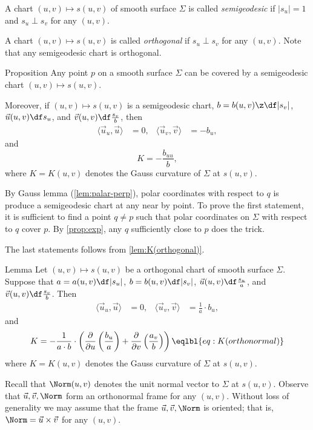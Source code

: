 A chart $(u,v)\mapsto s(u,v)$ of smooth surface $\Sigma$ is called \emph{semigeodesic} if $|s_u|=1$ and $s_u\perp s_v$ for any $(u,v)$.

A chart $(u,v)\mapsto s(u,v)$ is called \emph{orthogonal} if $s_u\perp s_v$ for any $(u,v)$.
Note that any semigeodesic chart is orthogonal.

\begin{thm}{Proposition}\label{prop:K(semigeodesic)}
Any point $p$ on a smooth surface $\Sigma$ can be covered by a semigeodesic chart $(u,v)\mapsto s(u,v)$.

Moreover, if $(u,v)\mapsto s(u,v)$ is a semigeodesic chart, 
$b=b(u,v)\z\df|s_v|$,
$\vec u(u,v)\df s_u$,
and 
$\vec v(u,v)\df\tfrac{s_v}b$,
then 
\begin{align*}
\langle\vec u_u,\vec u\rangle&=0,
&
\langle\vec u_v,\vec v\rangle&=-b_u,
\end{align*}
and 
\[K=-\frac{b_{uu}}b,\]
where $K=K(u,v)$ denotes the Gauss curvature of $\Sigma$ at $s(u,v)$.

\end{thm}

By Gauss lemma (\ref{lem:palar-perp}), polar coordinates with respect to $q$ is produce a semigeodesic chart at any near by point.
To prove the first statement, it is sufficient to find a point $q\ne p$ such that polar coordinates on $\Sigma$ with respect to $q$ cover $p$.
By \ref{prop:exp}, any $q$ sufficiently close to $p$ does the trick.

The last statements follows from \ref{lem:K(orthogonal)}.
\qeds

\begin{thm}{Lemma}\label{lem:K(orthogonal)}
Let $(u,v)\mapsto s(u,v)$ be a orthogonal chart of smooth surface $\Sigma$.
Suppose that 
$a=a(u,v)\df|s_u|$,
$b=b(u,v)\df|s_v|$,
$\vec u(u,v)\df\tfrac{s_u}a$,
and 
$\vec v(u,v)\df\tfrac{s_v}b$.
Then 
\begin{align*}
\langle\vec u_u,\vec u\rangle&=0,
&
\langle\vec u_v,\vec v\rangle&=\tfrac1a\cdot b_u,
\end{align*}
and 
\[K=-\frac1{a\cdot b}\cdot
\left(
\frac{\partial}{\partial u}
\left(\frac{b_u}a \right)
+
\frac{\partial}{\partial v}
\left(\frac{a_v}b\right)
\right)
\eqlbl{eq:K(orthonormal)}\]
where 
$K=K(u,v)$ denotes the Gauss curvature of $\Sigma$ at $s(u,v)$.
\end{thm}

Recall that $\Norm(u,v)$ denotes the unit normal vector to $\Sigma$ at $s(u,v)$.
Observe that $\vec u, \vec v,\Norm$ form an orthonormal frame for any $(u,v)$.
Without loss of generality we may assume that the frame $\vec u, \vec v,\Norm$ is oriented; that is, $\Norm=\vec u\times \vec v$ for any $(u,v)$.

